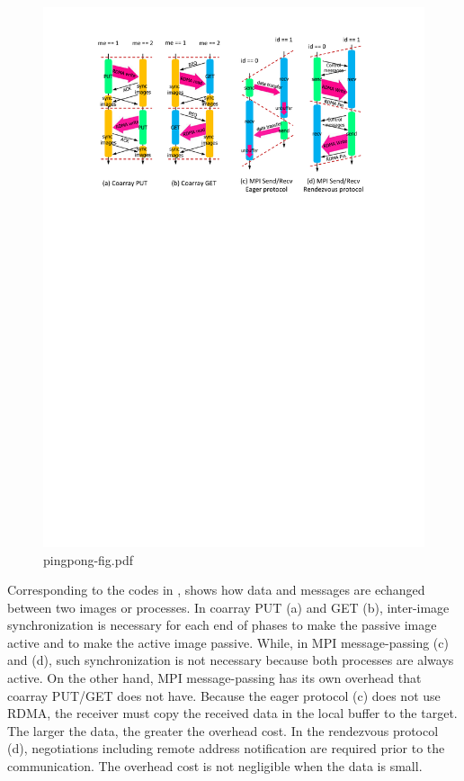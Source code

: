 \begin{figure}[bht]
  \begin{center}
    \mbox{\includegraphics[trim=30mm 195mm 32mm 16mm, scale=0.75,clip]{figs/pingpong-fig-r2.pdf}}
    \caption{pingpong-fig.pdf}\label{fig:pingpong-fig}
  \end{center}
\end{figure}

Corresponding to the codes in ,  shows how data and 
messages are echanged between two images or processes.
In coarray PUT (a) and GET (b), inter-image synchronization is necessary for each end of 
phases to make the passive image active and to make the active image passive.
While, in MPI message-passing (c) and (d), such synchronization is not necessary because
both processes are always active.
%
On the other hand, MPI message-passing has its own overhead that coarray PUT/GET
does not have. Because the eager protocol (c) does not use RDMA, the receiver
must copy the received data in the local buffer to the target. The larger the data,
the greater the overhead cost.
In the rendezvous protocol (d), negotiations including remote address notification
are required prior to the communication.
The overhead cost is not negligible when the data is small.


